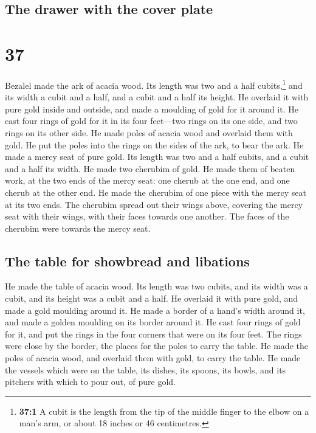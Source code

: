 \hypertarget{the-drawer-with-the-cover-plate}{%
\subsection{The drawer with the cover
plate}\label{the-drawer-with-the-cover-plate}}

\hypertarget{section-36}{%
\section{37}\label{section-36}}

 Bezalel made the ark of acacia wood. Its length was two
and a half cubits,\footnote{\textbf{37:1} A cubit is the length from the
  tip of the middle finger to the elbow on a man's arm, or about 18
  inches or 46 centimetres.} and its width a cubit and a half, and a
cubit and a half its height.  He overlaid it with pure
gold inside and outside, and made a moulding of gold for it around it.
 He cast four rings of gold for it in its four feet---two
rings on its one side, and two rings on its other side. 
He made poles of acacia wood and overlaid them with gold. 
He put the poles into the rings on the sides of the ark, to bear the
ark.  He made a mercy seat of pure gold. Its length was
two and a half cubits, and a cubit and a half its width. 
He made two cherubim of gold. He made them of beaten work, at the two
ends of the mercy seat:  one cherub at the one end, and
one cherub at the other end. He made the cherubim of one piece with the
mercy seat at its two ends.  The cherubim spread out their
wings above, covering the mercy seat with their wings, with their faces
towards one another. The faces of the cherubim were towards the mercy
seat.

\hypertarget{the-table-for-showbread-and-libations}{%
\subsection{The table for showbread and
libations}\label{the-table-for-showbread-and-libations}}

 He made the table of acacia wood. Its length was two
cubits, and its width was a cubit, and its height was a cubit and a
half.  He overlaid it with pure gold, and made a gold
moulding around it.  He made a border of a hand's width
around it, and made a golden moulding on its border around it.
 He cast four rings of gold for it, and put the rings in
the four corners that were on its four feet.  The rings
were close by the border, the places for the poles to carry the table.
 He made the poles of acacia wood, and overlaid them with
gold, to carry the table.  He made the vessels which were
on the table, its dishes, its spoons, its bowls, and its pitchers with
which to pour out, of pure gold.

